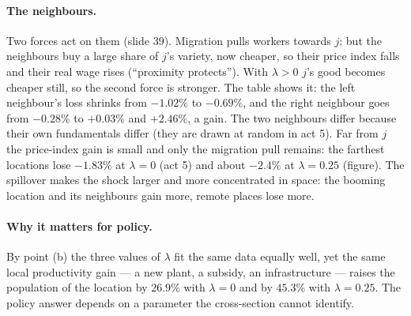 \documentclass[11pt,a4paper]{article}
\begin{document}
\paragraph{The neighbours.} Two forces act on them (slide 39). Migration pulls workers towards $j$; but the neighbours buy a large share of $j$'s variety, now cheaper, so their price index falls and their real wage rises (``proximity protects''). With $\lambda>0$ $j$'s good becomes cheaper still, so the second force is stronger. The table shows it: the left neighbour's loss shrinks from $-1.02\%$ to $-0.69\%$, and the right neighbour goes from $-0.28\%$ to $+0.03\%$ and $+2.46\%$, a gain. The two neighbours differ because their own fundamentals differ (they are drawn at random in act 5). Far from $j$ the price-index gain is small and only the migration pull remains: the farthest locations lose $-1.83\%$ at $\lambda=0$ (act 5) and about $-2.4\%$ at $\lambda=0.25$ (figure). The spillover makes the shock larger and more concentrated in space: the booming location and its neighbours gain more, remote places lose more.

\paragraph{Why it matters for policy.} By point (b) the three values of $\lambda$ fit the same data equally well, yet the same local productivity gain --- a new plant, a subsidy, an infrastructure --- raises the population of the location by $26.9\%$ with $\lambda=0$ and by $45.3\%$ with $\lambda=0.25$. The policy answer depends on a parameter the cross-section cannot identify.
\end{document}
